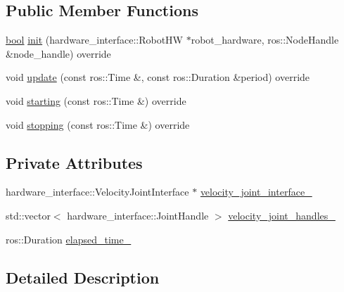 \subsection*{Public Member Functions}
\begin{DoxyCompactItemize}
\item 
\hyperlink{classbool}{bool} \hyperlink{classfranka__example__controllers_1_1JointVelocityExampleController_a97f6b9f2bd26bdb3700844549a5a803c}{init} (hardware\+\_\+interface\+::\+Robot\+HW $\ast$robot\+\_\+hardware, ros\+::\+Node\+Handle \&node\+\_\+handle) override
\item 
void \hyperlink{classfranka__example__controllers_1_1JointVelocityExampleController_af25c5523cd2f79a7bd2da9cc1a5348d6}{update} (const ros\+::\+Time \&, const ros\+::\+Duration \&period) override
\item 
void \hyperlink{classfranka__example__controllers_1_1JointVelocityExampleController_a6f0a4d2a40e3b3fd827de7a882401a35}{starting} (const ros\+::\+Time \&) override
\item 
void \hyperlink{classfranka__example__controllers_1_1JointVelocityExampleController_ae7557a0ea289d4d427f393fd5a4866b5}{stopping} (const ros\+::\+Time \&) override
\end{DoxyCompactItemize}
\subsection*{Private Attributes}
\begin{DoxyCompactItemize}
\item 
hardware\+\_\+interface\+::\+Velocity\+Joint\+Interface $\ast$ \hyperlink{classfranka__example__controllers_1_1JointVelocityExampleController_a34769e0599ac754774227087859986dd}{velocity\+\_\+joint\+\_\+interface\+\_\+}
\item 
std\+::vector$<$ hardware\+\_\+interface\+::\+Joint\+Handle $>$ \hyperlink{classfranka__example__controllers_1_1JointVelocityExampleController_ab88c025c1a93924c079416fe2dbe011e}{velocity\+\_\+joint\+\_\+handles\+\_\+}
\item 
ros\+::\+Duration \hyperlink{classfranka__example__controllers_1_1JointVelocityExampleController_a39a8d082e948e285156244f678b8e627}{elapsed\+\_\+time\+\_\+}
\end{DoxyCompactItemize}


\subsection{Detailed Description}


